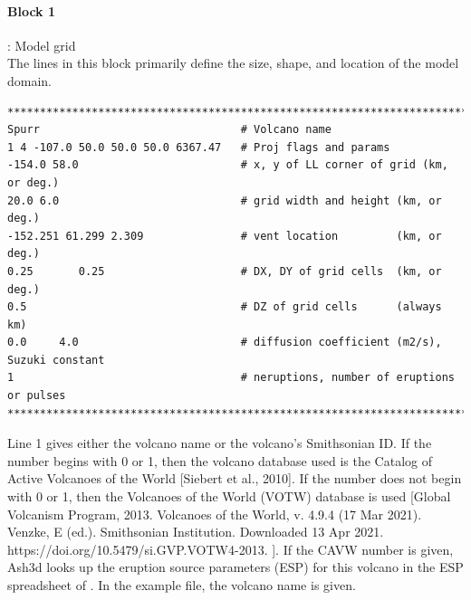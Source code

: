 \paragraph{Block 1}: Model grid\\
The lines in this block primarily define the size, shape,
and location of the model domain.
\small
\begin{verbatim}
*******************************************************************************
Spurr                               # Volcano name
1 4 -107.0 50.0 50.0 50.0 6367.47   # Proj flags and params
-154.0 58.0                         # x, y of LL corner of grid (km, or deg.)
20.0 6.0                            # grid width and height (km, or deg.)
-152.251 61.299 2.309               # vent location         (km, or deg.)
0.25       0.25                     # DX, DY of grid cells  (km, or deg.)
0.5                                 # DZ of grid cells      (always km)
0.0     4.0                         # diffusion coefficient (m2/s), Suzuki constant
1                                   # neruptions, number of eruptions or pulses
*******************************************************************************
\end{verbatim}
\normalsize

Line 1 gives either the volcano name or the volcano’s Smithsonian ID.
If the number begins with 0 or 1, then the volcano database used is
the Catalog of Active Volcanoes of the World [Siebert et al., 2010].
If the number does not begin with 0 or 1, then the Volcanoes of the
World (VOTW) database is used
[Global Volcanism Program, 2013. Volcanoes of the World, v. 4.9.4 (17 Mar 2021). Venzke, E (ed.). Smithsonian Institution. Downloaded 13 Apr 2021. https://doi.org/10.5479/si.GVP.VOTW4-2013. ].
If the CAVW number is given, Ash3d looks up the eruption source
parameters (ESP) for this volcano in the ESP spreadsheet of
\cite{Mastin09a}. In the example file, the volcano name
is given.


